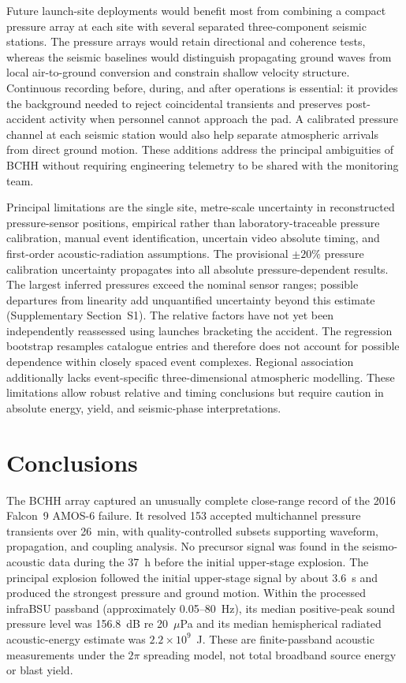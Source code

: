 \documentclass[]{seismica}
\begin{document}
Future launch-site deployments would benefit most from combining a compact
pressure array at each site with several separated three-component seismic
stations. The pressure arrays would retain directional and coherence tests,
whereas the seismic baselines would distinguish propagating ground waves from
local air-to-ground conversion and constrain shallow velocity structure.
Continuous recording before, during, and after operations is essential: it
provides the background needed to reject coincidental transients and preserves
post-accident activity when personnel cannot approach the pad. A calibrated
pressure channel at each seismic station would also help separate atmospheric
arrivals from direct ground motion. These additions address the principal
ambiguities of BCHH without requiring engineering telemetry to be shared with
the monitoring team.

Principal limitations are the single site, metre-scale uncertainty in
reconstructed pressure-sensor positions, empirical rather than
laboratory-traceable pressure calibration, manual event identification, uncertain video
absolute timing, and first-order acoustic-radiation assumptions. The provisional
$\pm20\%$ pressure calibration uncertainty propagates into all absolute
pressure-dependent results. The largest inferred pressures exceed the nominal
sensor ranges; possible departures from linearity add unquantified uncertainty
beyond this estimate (Supplementary Section~S1). The relative factors have not
yet been independently reassessed using launches bracketing the accident. The regression
bootstrap resamples catalogue entries and therefore does not account for
possible dependence within closely spaced event complexes. Regional
association additionally lacks event-specific three-dimensional atmospheric
modelling. These limitations allow robust relative and timing conclusions but
require caution in absolute energy, yield, and seismic-phase interpretations.

\section{Conclusions}
\label{sec:conclusions}

The BCHH array captured an unusually complete close-range record of the 2016
Falcon~9 AMOS-6 failure. It resolved 153 accepted multichannel pressure
transients over 26~min, with quality-controlled subsets supporting waveform,
propagation, and coupling analysis. No precursor signal was found in the
seismo-acoustic data during the 37~h before the initial upper-stage explosion. The principal explosion followed
the initial upper-stage signal by about 3.6~s and produced the strongest pressure
and ground motion. Within the processed infraBSU passband (approximately
0.05--80~Hz), its median positive-peak sound pressure level was 156.8~dB re
20~$\mu$Pa and its median hemispherical radiated acoustic-energy estimate was
$2.2\times10^9$~J. These are
finite-passband acoustic measurements under the $2\pi$ spreading model, not
total broadband source energy or blast yield.
\end{document}

